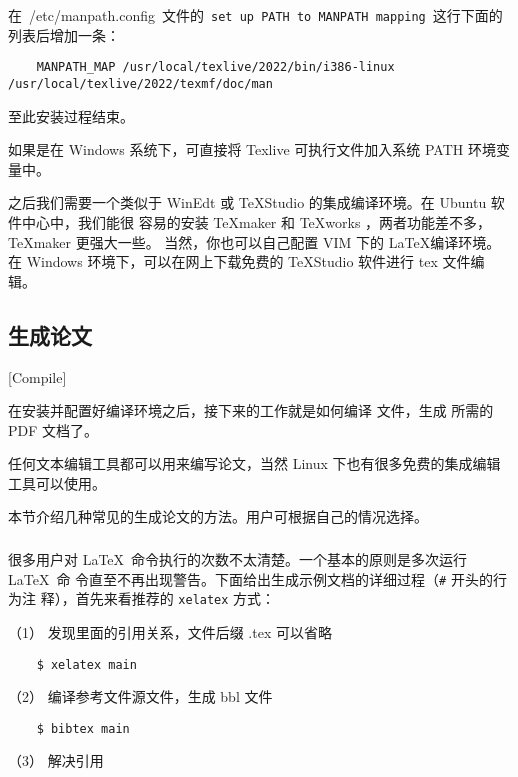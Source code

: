 在~{/etc/manpath.config}~文件的~\texttt{set up PATH to  MANPATH mapping}~这行下面的列表后增加一条：

\begin{lstlisting}
    MANPATH_MAP /usr/local/texlive/2022/bin/i386-linux /usr/local/texlive/2022/texmf/doc/man
  \end{lstlisting}

至此安装过程结束。

如果是在 Windows 系统下，可直接将 Texlive 可执行文件加入系统 PATH 环境变量中。

之后我们需要一个类似于 WinEdt 或 TeXStudio 的集成编译环境。在 Ubuntu 软件中心中，我们能很
容易的安装 \TeX{}maker 和 \TeX{}works ，两者功能差不多， \TeX{}maker 更强大一些。
当然，你也可以自己配置 VIM 下的 \LaTeX{}编译环境。在 Windows 环境下，可以在网上下载免费的
TeXStudio 软件进行 tex 文件编辑。

\subsection{生成论文}[Compile]
\label{sec:generate-thesis}

在安装并配置好编译环境之后，接下来的工作就是如何编译 \XeLaTeX{} 文件，生成
所需的 PDF 文档了。

任何文本编辑工具都可以用来编写论文，当然 Linux 下也有很多免费的集成编辑工具可以使用。

本节介绍几种常见的生成论文的方法。用户可根据自己的情况选择。

\subsubsection{\XeLaTeX}
\label{sec:xelatex}

很多用户对 \LaTeX\ 命令执行的次数不太清楚。一个基本的原则是多次运行 \LaTeX\ 命
令直至不再出现警告。下面给出生成示例文档的详细过程（\texttt{\#} 开头的行为注
释），首先来看推荐的 \texttt{xelatex} 方式：

（1） 发现里面的引用关系，文件后缀 .tex 可以省略

\begin{lstlisting}
    $ xelatex main
\end{lstlisting}

（2） 编译参考文件源文件，生成 bbl 文件

\begin{lstlisting}
    $ bibtex main
\end{lstlisting}

（3） 解决引用

